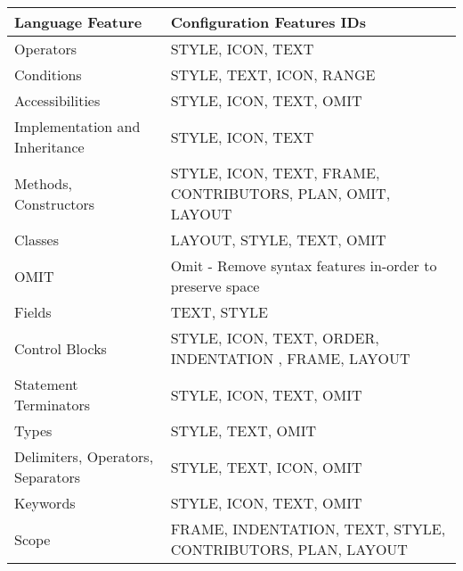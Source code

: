 \begin{table}[H]
\centering
\begin{tabular}{|l|p{11cm}|}
\hline
{\bf Language Feature}            & {\bf Configuration Features IDs}                                              \\ \hline
Operators                         & STYLE, ICON, TEXT                                                             \\ \hline
Conditions                        & STYLE, TEXT, ICON, RANGE                                                      \\ \hline
Accessibilities                   & STYLE, ICON, TEXT, OMIT                                                       \\ \hline
Implementation and Inheritance    & STYLE, ICON, TEXT                                                             \\ \hline
Methods, Constructors             & STYLE, ICON, TEXT, FRAME, CONTRIBUTORS, PLAN, OMIT, LAYOUT                    \\ \hline
Classes                           & LAYOUT, STYLE, TEXT, OMIT                                                     \\ \hline
OMIT                              & Omit - Remove syntax features in-order to preserve space                      \\ \hline
Fields                            & TEXT, STYLE                                                                   \\ \hline
Control Blocks                    & STYLE, ICON, TEXT, ORDER, INDENTATION , FRAME, LAYOUT                         \\ \hline
Statement Terminators             & STYLE, ICON, TEXT, OMIT                                                       \\ \hline
Types                             & STYLE, TEXT, OMIT                                                             \\ \hline
Delimiters, Operators, Separators & STYLE, TEXT, ICON, OMIT                                                       \\ \hline
Keywords                          & STYLE, ICON, TEXT, OMIT                                                       \\ \hline
Scope                             & FRAME, INDENTATION, TEXT, STYLE, CONTRIBUTORS, PLAN, LAYOUT                   \\ \hline

\end{tabular}
\end{table}
